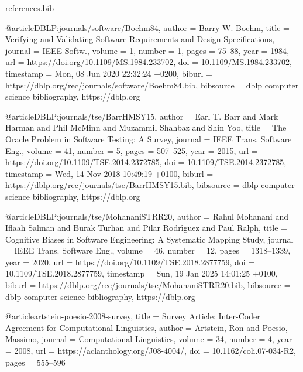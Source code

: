 \begin{filecontents*}{references.bib}

    @article{DBLP:journals/software/Boehm84,
      author       = {Barry W. Boehm},
      title        = {Verifying and Validating Software Requirements and Design Specifications},
      journal      = {{IEEE} Softw.},
      volume       = {1},
      number       = {1},
      pages        = {75--88},
      year         = {1984},
      url          = {https://doi.org/10.1109/MS.1984.233702},
      doi          = {10.1109/MS.1984.233702},
      timestamp    = {Mon, 08 Jun 2020 22:32:24 +0200},
      biburl       = {https://dblp.org/rec/journals/software/Boehm84.bib},
      bibsource    = {dblp computer science bibliography, https://dblp.org}
    }
    
    @article{DBLP:journals/tse/BarrHMSY15,
      author       = {Earl T. Barr and
                      Mark Harman and
                      Phil McMinn and
                      Muzammil Shahbaz and
                      Shin Yoo},
      title        = {The Oracle Problem in Software Testing: {A} Survey},
      journal      = {{IEEE} Trans. Software Eng.},
      volume       = {41},
      number       = {5},
      pages        = {507--525},
      year         = {2015},
      url          = {https://doi.org/10.1109/TSE.2014.2372785},
      doi          = {10.1109/TSE.2014.2372785},
      timestamp    = {Wed, 14 Nov 2018 10:49:19 +0100},
      biburl       = {https://dblp.org/rec/journals/tse/BarrHMSY15.bib},
      bibsource    = {dblp computer science bibliography, https://dblp.org}
    }
    
    @article{DBLP:journals/tse/MohananiSTRR20,
      author       = {Rahul Mohanani and
                      Iflaah Salman and
                      Burak Turhan and
                      Pilar Rodr{\'{\i}}guez and
                      Paul Ralph},
      title        = {Cognitive Biases in Software Engineering: {A} Systematic Mapping Study},
      journal      = {{IEEE} Trans. Software Eng.},
      volume       = {46},
      number       = {12},
      pages        = {1318--1339},
      year         = {2020},
      url          = {https://doi.org/10.1109/TSE.2018.2877759},
      doi          = {10.1109/TSE.2018.2877759},
      timestamp    = {Sun, 19 Jan 2025 14:01:25 +0100},
      biburl       = {https://dblp.org/rec/journals/tse/MohananiSTRR20.bib},
      bibsource    = {dblp computer science bibliography, https://dblp.org}
    }
    
    @article{artstein-poesio-2008-survey,
      title   = {Survey Article: Inter-Coder Agreement for Computational Linguistics},
      author  = {Artstein, Ron and Poesio, Massimo},
      journal = {Computational Linguistics},
      volume  = {34},
      number  = {4},
      year    = {2008},
      url     = {https://aclanthology.org/J08-4004/},
      doi     = {10.1162/coli.07-034-R2},
      pages   = {555--596}
    }
    

\end{filecontents*}

